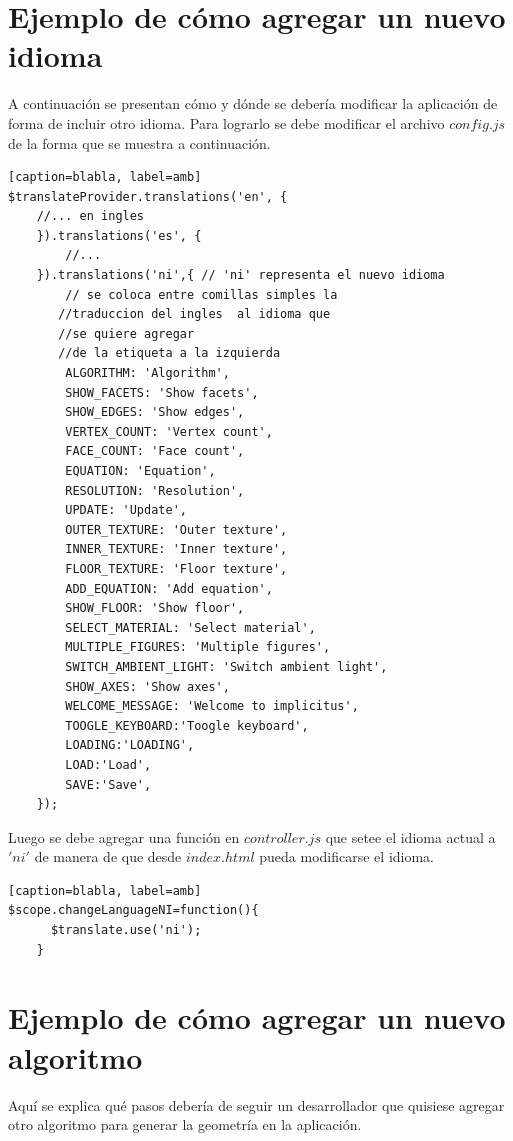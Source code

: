 \documentclass[12pt]{article}
\begin{document}
\section{Ejemplo de cómo agregar un nuevo idioma}
A continuación se presentan cómo y dónde se debería modificar la aplicación de forma de incluir otro idioma. 
Para lograrlo se debe modificar el archivo $config.js$ de la forma que se muestra a continuación.
\begin{lstlisting}[frame=single][caption=blabla, label=amb]
$translateProvider.translations('en', {
   	//... en ingles  
    }).translations('es', {
        //...                 
    }).translations('ni',{ // 'ni' representa el nuevo idioma
        // se coloca entre comillas simples la 
       //traduccion del ingles  al idioma que
       //se quiere agregar
       //de la etiqueta a la izquierda 
        ALGORITHM: 'Algorithm', 
        SHOW_FACETS: 'Show facets',
        SHOW_EDGES: 'Show edges',
        VERTEX_COUNT: 'Vertex count',
        FACE_COUNT: 'Face count',
        EQUATION: 'Equation',
        RESOLUTION: 'Resolution',
        UPDATE: 'Update',
        OUTER_TEXTURE: 'Outer texture',
        INNER_TEXTURE: 'Inner texture',
        FLOOR_TEXTURE: 'Floor texture',
        ADD_EQUATION: 'Add equation',
        SHOW_FLOOR: 'Show floor',
        SELECT_MATERIAL: 'Select material',
        MULTIPLE_FIGURES: 'Multiple figures',
        SWITCH_AMBIENT_LIGHT: 'Switch ambient light',
        SHOW_AXES: 'Show axes',
        WELCOME_MESSAGE: 'Welcome to implicitus',
        TOOGLE_KEYBOARD:'Toogle keyboard',
        LOADING:'LOADING',
        LOAD:'Load',
        SAVE:'Save', 
    });
\end{lstlisting}

Luego se debe agregar una función en $controller.js$ que setee el idioma actual a $'ni'$ de manera de que desde $index.html$ pueda modificarse el idioma.
\begin{lstlisting}[frame=single][caption=blabla, label=amb]
$scope.changeLanguageNI=function(){
      $translate.use('ni');
    }
\end{lstlisting}
\clearpage
\section{Ejemplo de cómo agregar un nuevo algoritmo}

Aquí se explica qué pasos debería de seguir un desarrollador que quisiese agregar otro algoritmo para generar la geometría en la aplicación.
\end{document}
